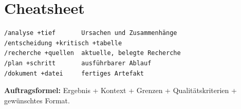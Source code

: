 \chapter{Cheatsheet}
\begin{lstlisting}
/analyse +tief       Ursachen und Zusammenhänge
/entscheidung +kritisch +tabelle
/recherche +quellen  aktuelle, belegte Recherche
/plan +schritt       ausführbarer Ablauf
/dokument +datei     fertiges Artefakt
\end{lstlisting}
\textbf{Auftragsformel:} Ergebnis + Kontext + Grenzen + Qualitätskriterien + gewünschtes Format.

